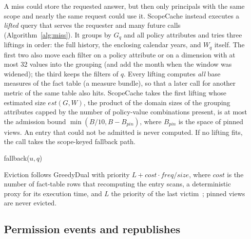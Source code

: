 \documentclass[sigconf, nonacm]{acmart}
\begin{document}
A miss could store the requested answer, but then only principals with the same scope and nearly the same request could use it. ScopeCache instead executes a \emph{lifted} query that serves the requester and many future calls (Algorithm~\ref{alg:miss}). It groups by $G_q$ and all policy attributes and tries three liftings in order: the full history, the enclosing calendar years, and $W_q$ itself. The first two also move each filter on a policy attribute or on a dimension with at most 32 values into the grouping (and add the month when the window was widened); the third keeps the filters of $q$. Every lifting computes \emph{all} base measures of the fact table (a measure bundle), so that a later call for another metric of the same table also hits. ScopeCache takes the first lifting whose estimated size $\mathit{est}(G,W)$, the product of the domain sizes of the grouping attributes capped by the number of policy-value combinations present, is at most the admission bound $\min(B/10, B-B_{\mathit{pin}})$, where $B_{\mathit{pin}}$ is the space of pinned views. An entry that could not be admitted is never computed. If no lifting fits, the call takes the scope-keyed fallback path.

\begin{algorithm}[t]
\caption{ScopeCache miss for call $(u,q)$}
\label{alg:miss}
\Return fallback($u,q$)\;
\end{algorithm}

Eviction follows GreedyDual with priority $L+\mathit{cost}\cdot\mathit{freq}/\mathit{size}$, where $\mathit{cost}$ is the number of fact-table rows that recomputing the entry scans, a deterministic proxy for its execution time, and $L$ the priority of the last victim~\cite{young94,lbsc24}; pinned views are never evicted.

\subsection{Permission events and republishes}
\end{document}
